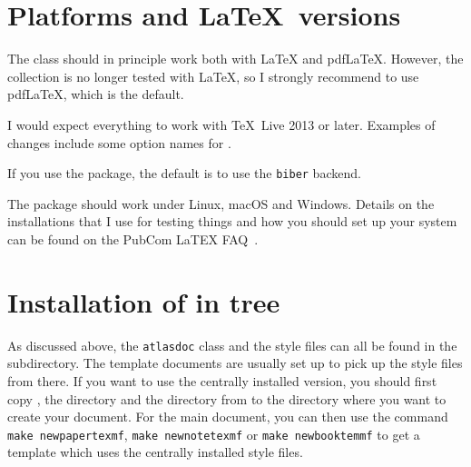 \section{Platforms and \LaTeX\ versions}
\label{sec:version}

The  class should in principle work both with \LaTeX{} and pdf\LaTeX{}.
However, the collection is no longer tested with \LaTeX,
so I strongly recommend to use pdf\LaTeX, which is the default.

I would expect everything to work with \TeX\ Live 2013 or later.
Examples of changes include some option names for .


 If you use the  package,
the default is to use the \texttt{biber} backend.

The  package should work under Linux, macOS and Windows.
Details on the installations that I use for testing things
and how you should set up your system can be found on the PubCom LaTEX FAQ~\cite{latex-faq}.


\section{Installation of  in  tree}%
\label{sec:texmf}

As discussed above, the \texttt{atlasdoc} class and the style files can all be found in the 
 subdirectory. The template documents are usually set up to pick up the style files from there.
If you want to use the centrally installed version,
you should first copy , the  directory and the  directory from 
 to the directory where you want to create your document.
For the main document, you can then use the command 
\texttt{make newpapertexmf}, \texttt{make newnotetexmf} or \texttt{make newbooktemmf} to get a template which uses the
centrally installed style files.

